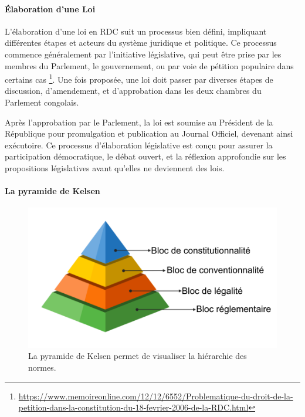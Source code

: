 \paragraph{Élaboration d'une Loi} \hspace{0pt}

L'élaboration d'une loi en RDC suit un processus bien défini, impliquant différentes étapes et acteurs du système juridique et politique. Ce processus commence généralement par l'initiative législative, qui peut être prise par les membres du Parlement, le gouvernement, ou par voie de pétition populaire dans certains cas \footnote{\href{https://www.memoireonline.com/12/12/6552/Problematique-du-droit-de-la-petition-dans-la-constitution-du-18-fevrier-2006-de-la-RDC.html}{https://www.memoireonline.com/12/12/6552/Problematique-du-droit-de-la-petition-dans-la-constitution-du-18-fevrier-2006-de-la-RDC.html}}. Une fois proposée, une loi doit passer par diverses étapes de discussion, d'amendement, et d'approbation dans les deux chambres du Parlement congolais.

Après l'approbation par le Parlement, la loi est soumise au Président de la République pour promulgation et publication au Journal Officiel, devenant ainsi exécutoire. Ce processus d'élaboration législative est conçu pour assurer la participation démocratique, le débat ouvert, et la réflexion approfondie sur les propositions législatives avant qu'elles ne deviennent des lois.

\paragraph{La pyramide de Kelsen \cite{Kelsen_Raphael_2024, Kelsen_jurixio_2023}} \hspace{0pt}

\begin{figure}[H]
    \centering
    \includegraphics[width=12cm]{gfx/fig-law-pyramide.png}
    \caption{La pyramide de Kelsen permet de visualiser la hiérarchie des normes. \cite{frwiki:212163472}}
    \label{fig:datagenerated}
\end{figure}


